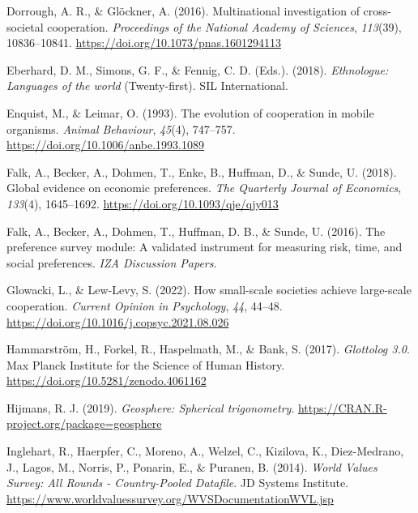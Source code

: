 \documentclass[
  man,floatsintext]{apa6}
\newlength{\cslhangindent}
\newlength{\cslentryspacingunit} %
\newenvironment{CSLReferences}[2] %
 {%
  \setlength{\parindent}{0pt}
  \ifodd #1
  \let\oldpar\par
  \def\par{\hangindent=\cslhangindent\oldpar}
  \fi
  \setlength{\parskip}{#2\cslentryspacingunit}
 }%
 {}
\begin{document}
\begin{CSLReferences}{1}{0}
\leavevmode{}%
Dorrough, A. R., \& Glöckner, A. (2016). Multinational investigation of cross-societal cooperation. \emph{Proceedings of the National Academy of Sciences}, \emph{113}(39), 10836--10841. \url{https://doi.org/10.1073/pnas.1601294113}

\leavevmode{}%
Eberhard, D. M., Simons, G. F., \& Fennig, C. D. (Eds.). (2018). \emph{Ethnologue: Languages of the world} (Twenty-first). SIL International.

\leavevmode{}%
Enquist, M., \& Leimar, O. (1993). The evolution of cooperation in mobile organisms. \emph{Animal Behaviour}, \emph{45}(4), 747--757. \url{https://doi.org/10.1006/anbe.1993.1089}

\leavevmode{}%
Falk, A., Becker, A., Dohmen, T., Enke, B., Huffman, D., \& Sunde, U. (2018). Global evidence on economic preferences. \emph{The Quarterly Journal of Economics}, \emph{133}(4), 1645--1692. \url{https://doi.org/10.1093/qje/qjy013}

\leavevmode{}%
Falk, A., Becker, A., Dohmen, T., Huffman, D. B., \& Sunde, U. (2016). The preference survey module: A validated instrument for measuring risk, time, and social preferences. \emph{IZA Discussion Papers}.

\leavevmode{}%
Glowacki, L., \& Lew-Levy, S. (2022). How small-scale societies achieve large-scale cooperation. \emph{Current Opinion in Psychology}, \emph{44}, 44--48. \url{https://doi.org/10.1016/j.copsyc.2021.08.026}

\leavevmode{}%
Hammarström, H., Forkel, R., Haspelmath, M., \& Bank, S. (2017). \emph{Glottolog 3.0}. Max Planck Institute for the Science of Human History. \url{https://doi.org/10.5281/zenodo.4061162}

\leavevmode{}%
Hijmans, R. J. (2019). \emph{Geosphere: Spherical trigonometry}. \url{https://CRAN.R-project.org/package=geosphere}

\leavevmode{}%
Inglehart, R., Haerpfer, C., Moreno, A., Welzel, C., Kizilova, K., Diez-Medrano, J., Lagos, M., Norris, P., Ponarin, E., \& Puranen, B. (2014). \emph{{World Values Survey: All Rounds - Country-Pooled Datafile}}. JD Systems Institute. \url{https://www.worldvaluessurvey.org/WVSDocumentationWVL.jsp}


\end{CSLReferences}
\end{document}
